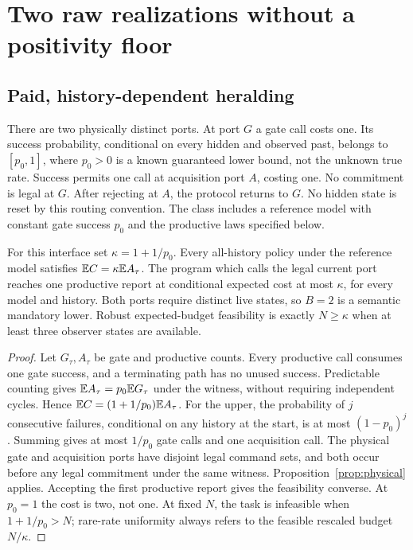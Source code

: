 \section{Two raw realizations without a positivity floor}
\label{sec:raw}
\subsection*{Paid, history-dependent heralding}
There are two physically distinct ports. At port $G$ a gate call costs one. Its success probability, conditional on every hidden and observed past, belongs to $[p_0,1]$, where $p_0>0$ is a known guaranteed lower bound, not the unknown true rate. Success permits one call at acquisition port $A$, costing one. No commitment is legal at $G$. After rejecting at $A$, the protocol returns to $G$. No hidden state is reset by this routing convention. The class includes a reference model with constant gate success $p_0$ and the productive laws specified below.

\begin{lemma}\label{lem:gate}
For this interface set $\kappa=1+1/p_0$. Every all-history policy under the reference model satisfies $\mathbb E C=\kappa\mathbb E A_\tau$. The program which calls the legal current port reaches one productive report at conditional expected cost at most $\kappa$, for every model and history. Both ports require distinct live states, so $B=2$ is a semantic mandatory lower. Robust expected-budget feasibility is exactly $N\ge\kappa$ when at least three observer states are available.
\end{lemma}
\begin{proof}
Let $G_\tau,A_\tau$ be gate and productive counts. Every productive call consumes one gate success, and a terminating path has no unused success. Predictable counting gives $\mathbb E A_\tau=p_0\mathbb E G_\tau$ under the witness, without requiring independent cycles. Hence $\mathbb E C=(1+1/p_0)\mathbb E A_\tau$. For the upper, the probability of $j$ consecutive failures, conditional on any history at the start, is at most $(1-p_0)^j$. Summing gives at most $1/p_0$ gate calls and one acquisition call. The physical gate and acquisition ports have disjoint legal command sets, and both occur before any legal commitment under the same witness. Proposition~\ref{prop:physical} applies. Accepting the first productive report gives the feasibility converse. At $p_0=1$ the cost is two, not one. At fixed $N$, the task is infeasible when $1+1/p_0>N$; rare-rate uniformity always refers to the feasible rescaled budget $N/\kappa$.
\end{proof}

